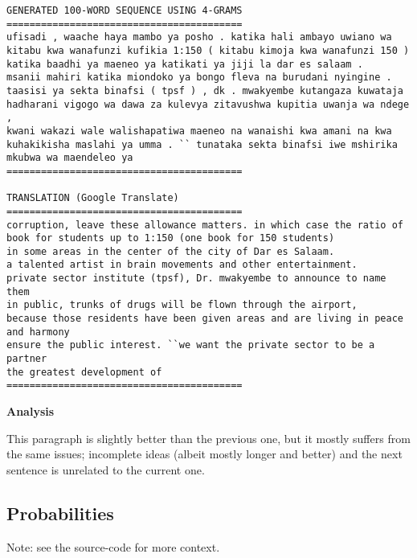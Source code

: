 \begin{center}
\begin{verbatim}
GENERATED 100-WORD SEQUENCE USING 4-GRAMS
=========================================
ufisadi , waache haya mambo ya posho . katika hali ambayo uwiano wa
kitabu kwa wanafunzi kufikia 1:150 ( kitabu kimoja kwa wanafunzi 150 )
katika baadhi ya maeneo ya katikati ya jiji la dar es salaam .
msanii mahiri katika miondoko ya bongo fleva na burudani nyingine .
taasisi ya sekta binafsi ( tpsf ) , dk . mwakyembe kutangaza kuwataja
hadharani vigogo wa dawa za kulevya zitavushwa kupitia uwanja wa ndege ,
kwani wakazi wale walishapatiwa maeneo na wanaishi kwa amani na kwa
kuhakikisha maslahi ya umma . `` tunataka sekta binafsi iwe mshirika
mkubwa wa maendeleo ya
=========================================

TRANSLATION (Google Translate)
=========================================
corruption, leave these allowance matters. in which case the ratio of
book for students up to 1:150 (one book for 150 students)
in some areas in the center of the city of Dar es Salaam.
a talented artist in brain movements and other entertainment.
private sector institute (tpsf), Dr. mwakyembe to announce to name them
in public, trunks of drugs will be flown through the airport,
because those residents have been given areas and are living in peace and harmony
ensure the public interest. ``we want the private sector to be a partner
the greatest development of
=========================================
\end{verbatim}
\end{center}

\textbf{Analysis}

This paragraph is slightly better than the previous one,
but it mostly suffers from the same issues;
incomplete ideas (albeit mostly longer and better)
and the next sentence is unrelated to the current one.

\newpage

\subsection{Probabilities}

Note: see the source-code for more context.

